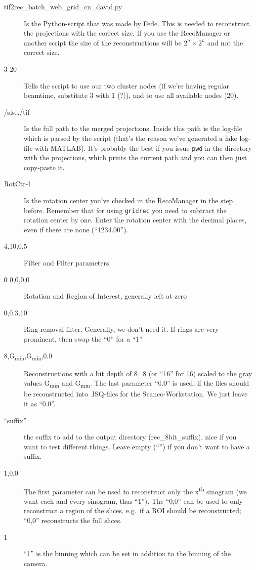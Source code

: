 \documentclass[a4paper]{scrartcl}
\begin{document}
\begin{description}
	\item [tif2rec_batch_web_grid_cn_david.py] Is the Python-script that was made by Fede. This is needed to reconstruct the projections with the correct size. If you use the RecoManager or another script the size of the reconstructions will be $2^{n}\times2^{n}$ and not the correct size.
	\item [3 20] Tells the script to use our two cluster nodes (if we're having regular beamtime, substitute 3 with 1 (?)), and to use all available nodes (20).
	\item [/sls\ldots/tif] Is the full path to the merged projections. Inside this path is the log-file which is parsed by the script (that's the reason we've generated a fake log-file with MATLAB). It's probably the best if you issue \verb+pwd+ in the directory with the projections, which prints the current path and you can then just copy-paste it.
	\item [RotCtr-1] Is the rotation center you've checked in the RecoManager in the step before. Remember that for using \verb+gridrec+ you need to subtract the rotation center by one. Enter the rotation center with the decimal places, even if there are none (``1234.00'').
	\item [4,10,0.5] Filter and Filter parameters
	\item [0 0,0,0,0] Rotation and Region of Interest, generally left at zero
	\item [0,0.3,10] Ring removal filter. Generally, we don't need it. If rings are very prominent, then swap the ``0'' for a ``1''
	\item [8,G\textsubscript{min},G\textsubscript{min},0.0] Reconstructions with a bit depth of 8=\SI{8}{\bit} (or ``16'' for \SI{16}{\bit}) scaled to the gray values G\textsubscript{min} and G\textsubscript{min}. The last parameter ``0.0'' is used, if the files should be reconstructed into .ISQ-files for the Scanco-Workstation. We just leave it as ``0.0''.
	\item [``suffix''] the suffix to add to the output directory (rec_8bit_suffix), nice if you want to test different things. Leave empty (``'') if you don't want to have a suffix.
	\item [1,0,0] The first parameter can be used to reconstruct only the x\textsuperscript{th} sinogram (we want each and every sinogram, thus ``1''). The ``0,0'' can be used to only reconstruct a region of the slices, e.g.\ if a ROI should be reconstructed; ``0,0'' reconstructs the full slices.
	\item [1] ``1'' is the binning which can be set in addition to the binning of the camera.
\end{description}
\end{document}
